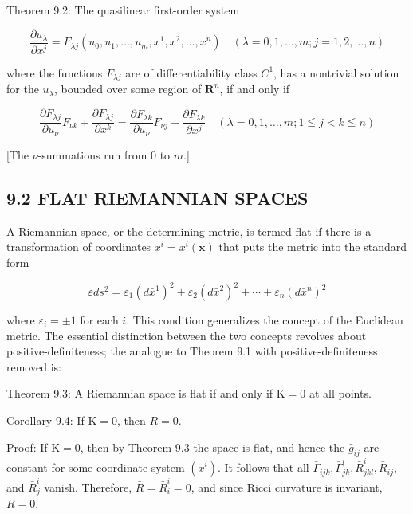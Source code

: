 \documentclass[10pt]{article}
\begin{document}
Theorem 9.2: The quasilinear first-order system

$$
\frac{\partial u_{\lambda}}{\partial x^{j}}=F_{\lambda j}\left(u_{0}, u_{1}, \ldots, u_{m}, x^{1}, x^{2}, \ldots, x^{n}\right) \quad(\lambda=0,1, \ldots, m ; j=1,2, \ldots, n)
$$

where the functions $F_{\lambda j}$ are of differentiability class $C^{1}$, has a nontrivial solution for the $u_{\lambda}$, bounded over some region of $\mathbf{R}^{n}$, if and only if

$$
\frac{\partial F_{\lambda j}}{\partial u_{\nu}} F_{\nu k}+\frac{\partial F_{\lambda j}}{\partial x^{k}}=\frac{\partial F_{\lambda k}}{\partial u_{\nu}} F_{\nu j}+\frac{\partial F_{\lambda k}}{\partial x^{j}} \quad(\lambda=0,1, \ldots, m ; 1 \leqq j<k \leqq n)
$$

[The $\nu$-summations run from 0 to $m$.]

\subsection*{9.2 FLAT RIEMANNIAN SPACES}
A Riemannian space, or the determining metric, is termed flat if there is a transformation of coordinates $\bar{x}^{i}=\bar{x}^{i}(\mathbf{x})$ that puts the metric into the standard form


\begin{equation*}
\varepsilon d s^{2}=\varepsilon_{1}\left(d \bar{x}^{1}\right)^{2}+\varepsilon_{2}\left(d \bar{x}^{2}\right)^{2}+\cdots+\varepsilon_{n}\left(d \bar{x}^{n}\right)^{2} \tag{9.4}
\end{equation*}


where $\varepsilon_{i}= \pm 1$ for each $i$. This condition generalizes the concept of the Euclidean metric. The essential distinction between the two concepts revolves about positive-definiteness; the analogue to Theorem 9.1 with positive-definiteness removed is:

Theorem 9.3: A Riemannian space is flat if and only if $\mathrm{K}=0$ at all points.

Corollary 9.4: If $\mathrm{K}=0$, then $R=0$.

Proof: If $\mathrm{K}=0$, then by Theorem 9.3 the space is flat, and hence the $\bar{g}_{i j}$ are constant for some coordinate system $\left(\bar{x}^{i}\right)$. It follows that all $\bar{\Gamma}_{i j k}, \bar{\Gamma}_{j k}^{i}, \bar{R}_{j k l}^{i}, \bar{R}_{i j}$, and $\bar{R}_{j}^{i}$ vanish. Therefore, $\bar{R}=\bar{R}_{i}^{i}=0$, and since Ricci curvature is invariant, $R=0$.
\end{document}
